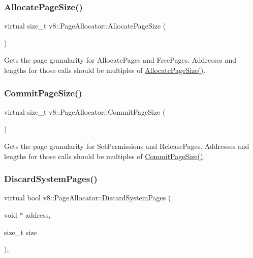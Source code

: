 \subsubsection{\texorpdfstring{Allocate\+Page\+Size()}{AllocatePageSize()}}
{\footnotesize\ttfamily virtual size\+\_\+t v8\+::\+Page\+Allocator\+::\+Allocate\+Page\+Size (\begin{DoxyParamCaption}{ }\end{DoxyParamCaption})\hspace{0.3cm}{\ttfamily [pure virtual]}}

Gets the page granularity for Allocate\+Pages and Free\+Pages. Addresses and lengths for those calls should be multiples of \mbox{\hyperlink{classv8_1_1PageAllocator_a92c2f6dbb3afa6c47dafd4c12ab4641f}{Allocate\+Page\+Size()}}. \mbox{\label{classv8_1_1PageAllocator_ad817d87004151e3824997415f2dc57e9}} 
\subsubsection{\texorpdfstring{Commit\+Page\+Size()}{CommitPageSize()}}
{\footnotesize\ttfamily virtual size\+\_\+t v8\+::\+Page\+Allocator\+::\+Commit\+Page\+Size (\begin{DoxyParamCaption}{ }\end{DoxyParamCaption})\hspace{0.3cm}{\ttfamily [pure virtual]}}

Gets the page granularity for Set\+Permissions and Release\+Pages. Addresses and lengths for those calls should be multiples of \mbox{\hyperlink{classv8_1_1PageAllocator_ad817d87004151e3824997415f2dc57e9}{Commit\+Page\+Size()}}. \mbox{\label{classv8_1_1PageAllocator_ad0de847c922e25f63d82494d997f441d}} 
\subsubsection{\texorpdfstring{Discard\+System\+Pages()}{DiscardSystemPages()}}
{\footnotesize\ttfamily virtual bool v8\+::\+Page\+Allocator\+::\+Discard\+System\+Pages (\begin{DoxyParamCaption}\item[{void $\ast$}]{address,  }\item[{size\+\_\+t}]{size }\end{DoxyParamCaption})\hspace{0.3cm}{\ttfamily [inline]}, {\ttfamily [virtual]}}

